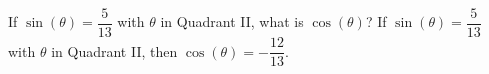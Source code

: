{If $\sin(\theta) = \dfrac{5}{13}$ with $\theta$ in Quadrant II, what is $\cos(\theta)$?}
{If $\sin(\theta) = \dfrac{5}{13}$ with $\theta$ in Quadrant II, then $\cos(\theta) = -\dfrac{12}{13}$.}